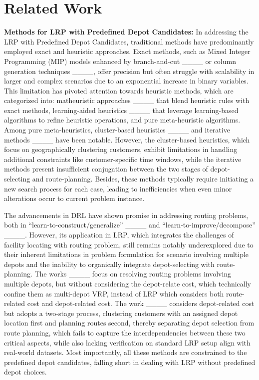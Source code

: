 \section{Related Work}
\textbf{Methods for LRP with Predefined Depot Candidates:}
In addressing the LRP with Predefined Depot Candidates, traditional methods have predominantly employed exact and heuristic approaches. 
Exact methods, such as Mixed Integer Programming (MIP) models enhanced by branch-and-cut ____ or column generation techniques ____, 
offer precision but often struggle with scalability in larger and complex scenarios due to an exponential increase in binary variables. 
This limitation has pivoted attention towards heuristic methods, which are categorized into: matheuristic approaches ____ that blend heuristic rules with exact methods, learning-aided heuristics ____ that leverage learning-based algorithms to refine heuristic operations, and pure meta-heuristic algorithms. 
Among pure meta-heuristics, cluster-based heuristics ____ and iterative methods ____ have been notable.
However, the cluster-based heuristics, which focus on geographically clustering customers, exhibit limitations in handling additional constraints like customer-specific time windows, 
while the iterative methods present insufficient conjugation between the two stages of depot-selecting and route-planning.
Besides, these methods typically require initiating a new search process for each case, leading to inefficiencies when even minor alterations occur to current problem instance.


The advancements in DRL have shown promise in addressing routing problems, both in ``learn-to-construct/generalize'' ____ and ``learn-to-improve/decompose'' ____. %
However, its application in LRP, which integrates the challenges of facility locating with routing problem, 
still remains notably underexplored due to their inherent limitations in problem formulation for scenario involving multiple depots and the inability to organically integrate depot-selecting with route-planning. 
The works ____ focus on resolving routing problems involving multiple depots, but without considering the depot-relate cost,
which technically confine them as multi-depot VRP, instead of LRP which considers both route-related cost and depot-related cost.
The work ____ considers depot-related cost but adopts a two-stage process, 
clustering customers with an assigned depot location first and planning routes second,
thereby separating depot selection from route planning, 
which fails to capture the interdependencies between these two critical aspects, 
while also lacking verification on standard LRP setup align with real-world datasets.
Most importantly, all these methods are constrained to the predefined depot candidates, 
falling short in dealing with LRP without predefined depot choices.

